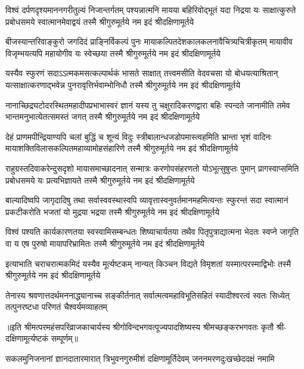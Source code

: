 

\fourlineindentedshloka
{विश्वं दर्पणदृश्यमाननगरीतुल्यं निजान्तर्गतम्}
{पश्यन्नात्मनि मायया बहिरिवोद्भूतं यदा निद्रया}
{यः साक्षात्कुरुते प्रबोधसमये स्वात्मानमेवाद्वयं}
{तस्मै श्रीगुरुमूर्तये नम इदं श्रीदक्षिणामूर्तये}

\fourlineindentedshloka
{बीजस्यान्तरिवाङ्कुरो जगदिदं प्राङ्\mbox{}निर्विकल्पं पुनः}
{मायाकल्पितदेशकालकलनावैचित्र्यचित्रीकृतम्}
{मायावीव विजृम्भयत्यपि महायोगीव यः स्वेच्छया}
{तस्मै श्रीगुरुमूर्तये नम इदं श्रीदक्षिणामूर्तये}

\fourlineindentedshloka
{यस्यैव स्फुरणं सदाऽऽत्मकमसत्कल्पार्थकं भासते}
{साक्षात् तत्त्वमसीति वेदवचसा यो बोधयत्याश्रितान्}
{यत्साक्षात्करणाद्भवेन्न पुनरावृत्तिर्भवाम्भोनिधौ}
{तस्मै श्रीगुरुमूर्तये नम इदं श्रीदक्षिणामूर्तये}

\fourlineindentedshloka
{नानाच्छिद्रघटोदरस्थितमहादीपप्रभाभास्वरं}
{ज्ञानं यस्य तु चक्षुरादिकरणद्वारा बहिः स्पन्दते}
{जानामीति तमेव भान्तमनुभात्येतत्समस्तं जगत्}
{तस्मै श्रीगुरुमूर्तये नम इदं श्रीदक्षिणामूर्तये}

\fourlineindentedshloka
{देहं प्राणमपीन्द्रियाण्यपि चलां बुद्धिं च शून्यं विदुः}
{स्त्रीबालान्धजडोपमास्त्वहमिति भ्रान्ता भृशं वादिनः}
{मायाशक्तिविलासकल्पितमहाव्यामोहसंहारिणे}
{तस्मै श्रीगुरुमूर्तये नम इदं श्रीदक्षिणामूर्तये}

\fourlineindentedshloka
{राहुग्रस्तदिवाकरेन्दुसदृशो मायासमाच्छादनात्}
{सन्मात्रः करणोपसंहरणतो योऽभूत्सुषुप्तः पुमान्}
{प्रागस्वाप्समिति प्रबोधसमये यः प्रत्यभिज्ञायते}
{तस्मै श्रीगुरुमूर्तये नम इदं श्रीदक्षिणामूर्तये}

\fourlineindentedshloka
{बाल्यादिष्वपि जागृदादिषु तथा सर्वास्ववस्थास्वपि}
{व्यावृत्तास्वनुवर्तमानमहमित्यन्तः स्फुरन्तं सदा}
{स्वात्मानं प्रकटीकरोति भजतां यो मुद्रया भद्रया}
{तस्मै श्रीगुरुमूर्तये नम इदं श्रीदक्षिणामूर्तये}

\fourlineindentedshloka
{विश्वं पश्यति कार्यकारणतया स्वस्वामिसम्बन्धतः}
{शिष्याचार्यतया तथैव पितृपुत्राद्यात्मना भेदतः}
{स्वप्ने जागृति वा य एष पुरुषो मायापरिभ्रामितः}
{तस्मै श्रीगुरुमूर्तये नम इदं श्रीदक्षिणामूर्तये}

{इत्याभाति चराचरात्मकमिदं यस्यैव मूर्त्यष्टकम्}
{नान्यत् किञ्चन विद्यते विमृशतां यस्मात्परस्माद्विभोः}
{तस्मै श्रीगुरुमूर्तये नम इदं श्रीदक्षिणामूर्तये}

{तेनास्य श्रवणात्तदर्थमननाद्ध्यानाच्च सङ्कीर्तनात्}
{सर्वात्मत्वमहाविभूतिसहितं स्यादीश्वरत्वं स्वतः}
{सिध्येत् तत्पुनरष्टधा परिणतं चैश्वर्यमव्याहतम्}

॥इति श्रीमत्परमहंसपरिव्राजकाचार्यस्य श्रीगोविन्दभगवत्पूज्यपादशिष्यस्य 
श्रीमच्छङ्करभगवतः कृतौ श्री-दक्षिणामूर्त्यष्टकं सम्पूर्णम्॥

\closesection
{}
{सकलमुनिजनानां ज्ञानदातारमारात्}
{त्रिभुवनगुरुमीशं दक्षिणामूर्तिदेवम्}
{जननमरणदुःखच्छेददक्षं नमामि}